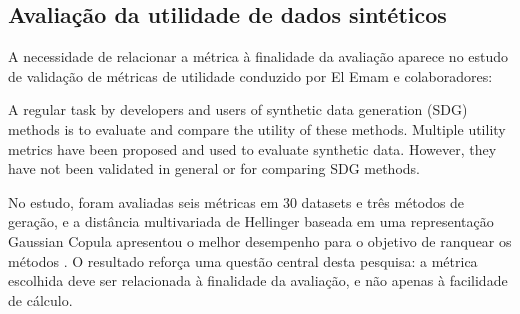 \subsection{Avaliação da utilidade de dados sintéticos}

A necessidade de relacionar a métrica à finalidade da avaliação aparece no
estudo de validação de métricas de utilidade conduzido por El Emam e
colaboradores:

\begin{citacao}
A regular task by developers and users of synthetic data generation (SDG)
methods is to evaluate and compare the utility of these methods. Multiple
utility metrics have been proposed and used to evaluate synthetic data.
However, they have not been validated in general or for comparing SDG methods.
\parencite{elemam2022}
\end{citacao}

No estudo, foram avaliadas seis métricas em 30 datasets e três métodos de
geração, e a distância multivariada de Hellinger baseada em uma representação
Gaussian Copula apresentou o melhor desempenho para o objetivo de ranquear os
métodos \parencite{elemam2022}. O resultado reforça uma questão central desta
pesquisa: a métrica escolhida deve ser relacionada à finalidade da avaliação, e
não apenas à facilidade de cálculo.
